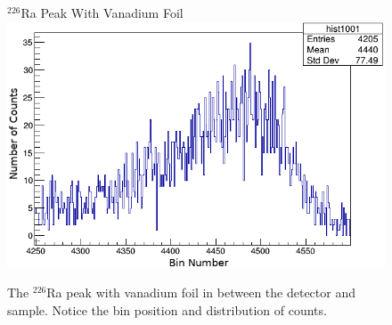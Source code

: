 \documentclass[10pt]{IEEEtran}
\begin{document}
    \begin{figure}[!h]
        \begin{center}
        $^{226}$Ra Peak With Vanadium Foil
        \includegraphics[width=\columnwidth]{1001_4958.png}
       \caption{The $^{226}$Ra peak with vanadium foil in between the detector and sample. Notice the bin position and distribution of counts.}
        \label{fig:1001_4958}
        \end{center}
    \end{figure}
    
\end{document}
